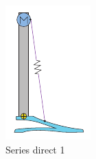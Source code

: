 \begin{figure}[hb!]
\begin{subfigure}{.19\textwidth}
    \includegraphics[width=\linewidth]{figures/illustration_serial_direct_i.pdf}
    \caption{Series direct 1}
    \label{fig:series_direct_i}
  \end{subfigure}
  \begin{subfigure}{.19\textwidth}
    \centering

\end{subfigure}
\end{figure}
